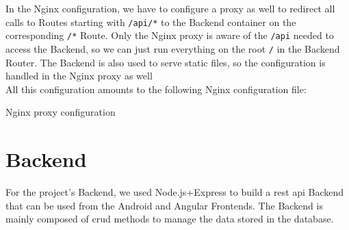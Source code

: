 \documentclass[twoside, openright,11pt,a4paper]{book}
\newenvironment{code}{\captionsetup{type=listing}}{}
\begin{document}
In the Nginx configuration, we have to configure a proxy as well to redirect all calls to Routes starting with \verb+/api/*+ to the Backend container on the corresponding \verb+/*+ Route. Only the Nginx proxy is aware of the \verb+/api+ needed to access the Backend, so we can just run everything on the root \verb+/+ in the Backend Router. The Backend is also used to serve static files, so the configuration is handled in the Nginx proxy as well \\

All this configuration amounts to the following Nginx configuration file:
\begin{code}
	\caption{Nginx proxy configuration}
\end{code}

\section{Backend}
For the project's Backend, we used Node.js+Express to build a \gls{rest} \gls{api} Backend that can be used from the Android and Angular Frontends. The Backend is mainly composed of \gls{crud} methods to manage the data stored in the database.
\end{document}
